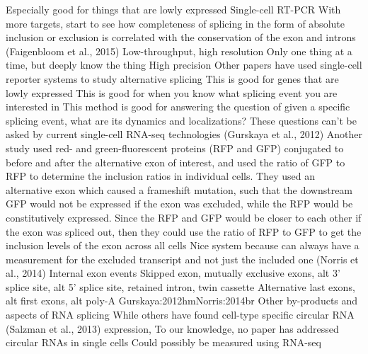Especially good for things that are lowly expressed
Single-cell RT-PCR
With more targets, start to see how completeness of splicing in the form of absolute inclusion or exclusion is correlated with the conservation of the exon and introns (Faigenbloom et al., 2015)
Low-throughput, high resolution
Only one thing at a time, but deeply know the thing
High precision
Other papers have used single-cell reporter systems to study alternative splicing
This is good for genes that are lowly expressed
This is good for when you know what splicing event you are interested in
This method is good for answering the question of given a specific splicing event, what are its dynamics and localizations?
These questions can’t be asked by current single-cell RNA-seq technologies
(Gurskaya et al., 2012)
Another study used red- and green-fluorescent proteins (RFP and GFP) conjugated to before and after the alternative exon of interest, and used the ratio of GFP to RFP to determine the inclusion ratios in individual cells. 
They used an alternative exon which caused a frameshift mutation, such that the downstream GFP would not be expressed if the exon was excluded, while the RFP would be constitutively expressed.
Since the RFP and GFP would be closer to each other if the exon was spliced out, then they could use the ratio of RFP to GFP to get the inclusion levels of the exon across all cells
Nice system because can always have a measurement for the excluded transcript and not just the included one
(Norris et al., 2014)
Internal exon events
Skipped exon, mutually exclusive exons, alt 3’ splice site, alt 5’ splice site, retained intron, twin cassette
Alternative last exons, alt first exons, alt poly-A
{Gurskaya:2012hm}{Norris:2014br}
Other by-products and aspects of RNA splicing
While others have found cell-type specific circular RNA (Salzman et al., 2013) expression, To our knowledge, no paper has addressed circular RNAs in single cells
Could possibly be measured using RNA-seq


